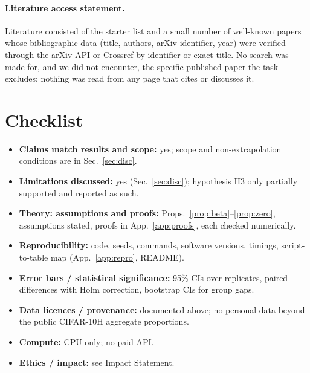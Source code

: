 \paragraph{Literature access statement.} Literature consisted of the starter list and a small number of well-known papers whose bibliographic data (title, authors, arXiv identifier, year) were verified through the arXiv API or Crossref by identifier or exact title. No search was made for, and we did not encounter, the specific published paper the task excludes; nothing was read from any page that cites or discusses it.

\section{Checklist}
\begin{itemize}\setlength{\itemsep}{0pt}
\item \textbf{Claims match results and scope:} yes; scope and non-extrapolation conditions are in Sec.~\ref{sec:disc}.
\item \textbf{Limitations discussed:} yes (Sec.~\ref{sec:disc}); hypothesis H3 only partially supported and reported as such.
\item \textbf{Theory: assumptions and proofs:} Props.~\ref{prop:beta}--\ref{prop:zero}, assumptions stated, proofs in App.~\ref{app:proofs}, each checked numerically.
\item \textbf{Reproducibility:} code, seeds, commands, software versions, timings, script-to-table map (App.~\ref{app:repro}, README).
\item \textbf{Error bars / statistical significance:} 95\% CIs over replicates, paired differences with Holm correction, bootstrap CIs for group gaps.
\item \textbf{Data licences / provenance:} documented above; no personal data beyond the public CIFAR-10H aggregate proportions.
\item \textbf{Compute:} CPU only; no paid API.
\item \textbf{Ethics / impact:} see Impact Statement.
\end{itemize}

